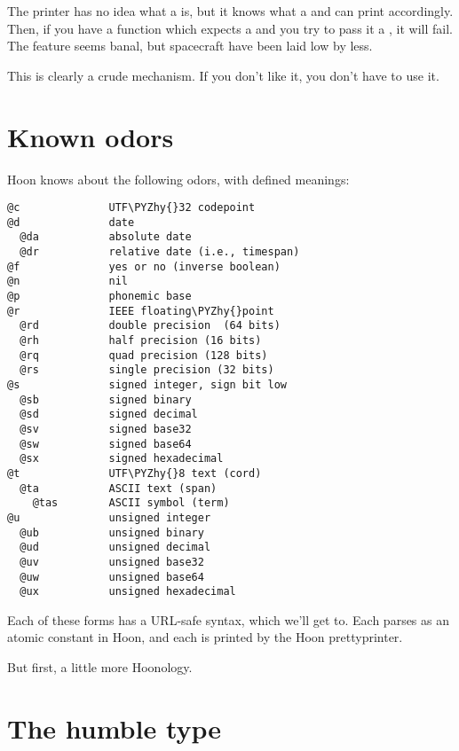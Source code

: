 The printer has no idea what a  is, but it knows what a
 and can print accordingly.  Then, if you have a function
which expects a  and you try to pass it a , it will
fail.  The feature seems banal, but spacecraft have been laid low
by less.

This is clearly a crude mechanism.  If you don't like it, you
don't have to use it.

\section{Known odors}

Hoon knows about the following odors, with defined meanings:

\begin{framed_shaded}
\begin{Verbatim}[fontsize=\relsize{-2.5},fontseries=b,commandchars=\\\{\}]
@c              UTF\PYZhy{}32 codepoint
@d              date
  @da           absolute date
  @dr           relative date (i.e., timespan)
@f              yes or no (inverse boolean)
@n              nil
@p              phonemic base
@r              IEEE floating\PYZhy{}point
  @rd           double precision  (64 bits)
  @rh           half precision (16 bits)
  @rq           quad precision (128 bits)
  @rs           single precision (32 bits)
@s              signed integer, sign bit low
  @sb           signed binary
  @sd           signed decimal
  @sv           signed base32
  @sw           signed base64
  @sx           signed hexadecimal
@t              UTF\PYZhy{}8 text (cord)
  @ta           ASCII text (span)
    @tas        ASCII symbol (term)
@u              unsigned integer
  @ub           unsigned binary
  @ud           unsigned decimal
  @uv           unsigned base32
  @uw           unsigned base64
  @ux           unsigned hexadecimal
\end{Verbatim}
\end{framed_shaded}

Each of these forms has a URL-safe syntax, which we'll get to.
Each parses as an atomic constant in Hoon, and each is printed
by the Hoon prettyprinter.

But first, a little more Hoonology.

\section{The humble type}

